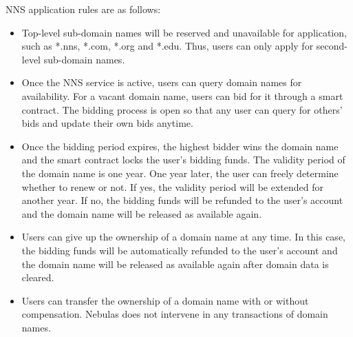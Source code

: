 NNS application rules are as follows:
\begin{itemize}

	\item Top-level sub-domain names will be reserved and unavailable for application, such as *.nns, *.com, *.org and *.edu. Thus, users can only apply for second-level sub-domain names.
	\item Once the NNS service is active, users can query domain names for availability. For a vacant domain name, users can bid for it through a smart contract. The bidding process is open so that any user can query for others' bids and update their own bids anytime.
	\item Once the bidding period expires, the highest bidder wins the domain name and the smart contract locks the user's bidding funds. The validity period of the domain name is one year. One year later, the user can freely determine whether to renew or not. If yes, the validity period will be extended for another year. If no, the bidding funds will be refunded to the user's account and the domain name will be released as available again.
	\item Users can give up the ownership of a domain name at any time. In this case, the bidding funds will be automatically refunded to the user's account and the domain name will be released as available again after domain data is cleared.
	\item Users can transfer the ownership of a domain name with or without compensation. Nebulas does not intervene in any transactions of domain names.

\end{itemize}


